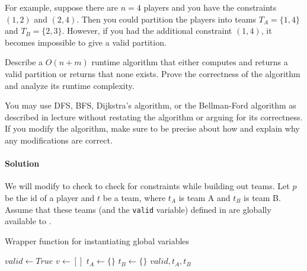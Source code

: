 \documentclass[11pt]{article}
\begin{document}
For example, suppose there are $n=4$ players and you have the constraints $(1, 2)$ and $(2, 4)$. Then you could partition the players into teams $T_A = \{1, 4\}$ and $T_B = \{2, 3\}$. However, if you had the additional constraint $(1, 4)$, it becomes impossible to give a valid partition.

Describe a $O(n+m)$ runtime algorithm that either computes and returns a valid partition or returns that none exists. Prove the correctness of the algorithm and analyze its runtime complexity.

You may use DFS, BFS, Dijkstra's algorithm, or the Bellman-Ford algorithm as described in lecture without restating the algorithm or arguing for its correctness. If you modify the algorithm, make sure to be precise about how and explain why any modifications are correct.

\paragraph{Solution}
We will modify  to check to check for constraints while building out
teams. Let $p$ be the id of a player and $t$ be a team, where $t_{A}$ is team
A and $t_{B}$ is team B. Assume that these teams (and the \texttt{valid} 
variable) defined in  are globally available to 
.

\begin{algorithm}
\caption{Wrapper function for instantiating global variables}
\begin{algorithmic}[1]
    \State $valid \leftarrow True$
    \State $v \leftarrow []$
    \State $t_{A} \leftarrow \{\}$
    \State $t_{B} \leftarrow \{\}$
    \State {}
    \State \Return $valid, t_{A}, t_{B}$
\EndProcedure 
\end{algorithmic}
\end{algorithm}
\end{document}
